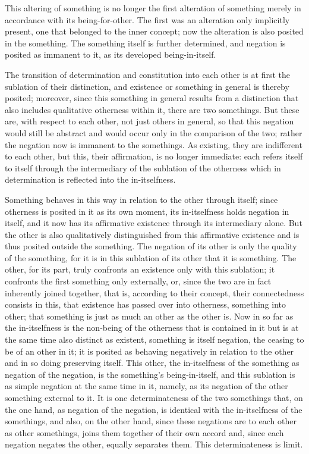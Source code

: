 This altering of something is no longer
the first alteration of something merely
in accordance with its being-for-other.
The first was an alteration only implicitly present,
one that belonged to the inner concept;
now the alteration is also posited in the something.
The something itself is further determined,
and negation is posited as immanent to it,
as its developed being-in-itself.

The transition of determination and constitution
into each other is at first the sublation of their distinction,
and existence or something in general is thereby posited;
moreover, since this something in general results
from a distinction that also includes
qualitative otherness within it,
there are two somethings.
But these are, with respect to each other,
not just others in general,
so that this negation would still be abstract
and would occur only in the comparison of the two;
rather the negation now is immanent to the somethings.
As existing, they are indifferent to each other,
but this, their affirmation, is no longer immediate:
each refers itself to itself through the intermediary of
the sublation of the otherness which in determination is
reflected into the in-itselfness.

Something behaves in this way in relation
to the other through itself;
since otherness is posited in it as its own moment,
its in-itselfness holds negation in itself,
and it now has its affirmative existence
through its intermediary alone.
But the other is also qualitatively distinguished
from this affirmative existence
and is thus posited outside the something.
The negation of its other is only
the quality of the something,
for it is in this sublation of its other
that it is something.
The other, for its part,
truly confronts an existence
only with this sublation;
it confronts the first something only externally,
or, since the two are in fact inherently joined together,
that is, according to their concept,
their connectedness consists in this,
that existence has passed over into otherness,
something into other;
that something is just as much an other as the other is.
Now in so far as the in-itselfness is
the non-being of the otherness
that is contained in it
but is at the same time
also distinct as existent,
something is itself negation,
the ceasing to be of an other in it;
it is posited as behaving negatively in relation to
the other and in so doing preserving itself.
This other, the in-itselfness of
the something as negation of the negation,
is the something's being-in-itself,
and this sublation is as simple negation
at the same time in it, namely, as its negation
of the other something external to it.
It is one determinateness of the two somethings
that, on the one hand, as negation of the negation,
is identical with the in-itselfness of the somethings,
and also, on the other hand, since these negations are
to each other as other somethings,
joins them together of their own accord
and, since each negation negates the other,
equally separates them.
This determinateness is limit.

